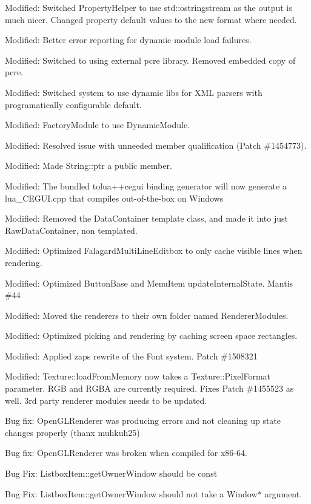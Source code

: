 \begin{DoxyItemize}
\item Modified\+: Switched Property\+Helper to use std\+::ostringstream as the output is much nicer. Changed property default values to the new format where needed.
\item Modified\+: Better error reporting for dynamic module load failures.
\item Modified\+: Switched to using external pcre library. Removed embedded copy of pcre.
\item Modified\+: Switched system to use dynamic libs for X\+ML parsers with programatically configurable default.
\item Modified\+: Factory\+Module to use Dynamic\+Module.
\item Modified\+: Resolved issue with unneeded member qualification (Patch \#1454773).
\item Modified\+: Made String\+::ptr a public member.
\item Modified\+: The bundled tolua++cegui binding generator will now generate a lua\+\_\+\+C\+E\+G\+U\+I.\+cpp that compiles out-\/of-\/the-\/box on Windows
\item Modified\+: Removed the Data\+Container template class, and made it into just Raw\+Data\+Container, non templated.
\item Modified\+: Optimized Falagard\+Multi\+Line\+Editbox to only cache visible lines when rendering.
\item Modified\+: Optimized Button\+Base and Menu\+Item update\+Internal\+State. Mantis \#44
\item Modified\+: Moved the renderers to their own folder named Renderer\+Modules.
\item Modified\+: Optimized picking and rendering by caching screen space rectangles.
\item Modified\+: Applied zap\textquotesingle{}s rewrite of the Font system. Patch \#1508321
\item Modified\+: Texture\+::load\+From\+Memory now takes a Texture\+::\+Pixel\+Format parameter. R\+GB and R\+G\+BA are currently required. Fixes Patch \#1455523 as well. 3rd party renderer modules needs to be updated.
\item Bug fix\+: Open\+G\+L\+Renderer was producing errors and not cleaning up state changes properly (thanx muhkuh25)
\item Bug fix\+: Open\+G\+L\+Renderer was broken when compiled for x86-\/64.
\item Bug Fix\+: Listbox\+Item\+::get\+Owner\+Window should be const
\item Bug Fix\+: Listbox\+Item\+::get\+Owner\+Window should not take a Window$\ast$ argument.

\end{DoxyItemize}
